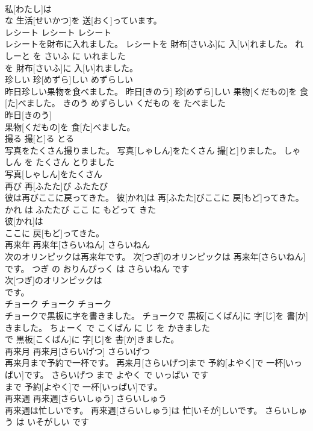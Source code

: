 \documentclass[8pt]{extreport}
\begin{document}
\begin{CJK}{UTF8}{min}
\\	私[わたし]は
\\	な 生活[せいかつ]を 送[おく]っています。			
\\	レシート	レシート	レシート	
\\	レシートを財布に入れました。	レシートを 財布[さいふ]に 入[い]れました。	れしーと を さいふ に いれました	
\\	を 財布[さいふ]に 入[い]れました。			
\\	珍しい	珍[めずら]しい	めずらしい	
\\	昨日珍しい果物を食べました。	昨日[きのう] 珍[めずら]しい 果物[くだもの]を 食[た]べました。	きのう めずらしい くだもの を たべました	
\\	昨日[きのう]
\\	果物[くだもの]を 食[た]べました。			
\\	撮る	撮[と]る	とる	
\\	写真をたくさん撮りました。	写真[しゃしん]をたくさん 撮[と]りました。	しゃしん を たくさん とりました	
\\	写真[しゃしん]をたくさん
\\	再び	再[ふたた]び	ふたたび	
\\	彼は再びここに戻ってきた。	彼[かれ]は 再[ふたた]びここに 戻[もど]ってきた。	かれ は ふたたび ここ に もどって きた	
\\	彼[かれ]は
\\	ここに 戻[もど]ってきた。			
\\	再来年	再来年[さらいねん]	さらいねん	
\\	次のオリンピックは再来年です。	次[つぎ]のオリンピックは 再来年[さらいねん]です。	つぎ の おりんぴっく は さらいねん です	
\\	次[つぎ]のオリンピックは
\\	です。			
\\	チョーク	チョーク	チョーク	
\\	チョークで黒板に字を書きました。	チョークで 黒板[こくばん]に 字[じ]を 書[か]きました。	ちょーく で こくばん に じ を かきました	
\\	で 黒板[こくばん]に 字[じ]を 書[か]きました。			
\\	再来月	再来月[さらいげつ]	さらいげつ	
\\	再来月まで予約で一杯です。	再来月[さらいげつ]まで 予約[よやく]で 一杯[いっぱい]です。	さらいげつ まで よやく で いっぱい です	
\\	まで 予約[よやく]で 一杯[いっぱい]です。			
\\	再来週	再来週[さらいしゅう]	さらいしゅう	
\\	再来週は忙しいです。	再来週[さらいしゅう]は 忙[いそが]しいです。	さらいしゅう は いそがしい です	

\end{CJK}
\end{document}
